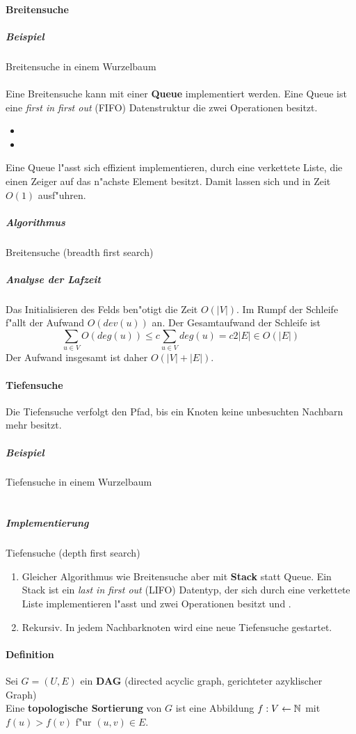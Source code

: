 \paragraph{Breitensuche}
\subparagraph{Beispiel} Breitensuche in einem Wurzelbaum\\
\\ %
Eine Breitensuche kann mit einer \textbf{Queue} implementiert werden. Eine Queue ist eine
\textit{first in first out} (FIFO) Datenstruktur die zwei Operationen besitzt.
\begin{itemize}
    \item {}
    \item {}
\end{itemize}
Eine Queue l"asst sich effizient implementieren, durch eine verkettete Liste, die einen Zeiger auf das n"achste
Element besitzt. Damit lassen sich  und  in Zeit $O(1)$ ausf"uhren.

\subparagraph{Algorithmus} Breitensuche (breadth first search)

\subparagraph{Analyse der Lafzeit} \parskp
Das Initialisieren des Felds  ben"otigt die Zeit $O(|V|)$. Im Rumpf der  Schleife
f"allt der Aufwand $O(dev(u))$ an. Der Gesamtaufwand der  Schleife ist
\[
    \sum_{u\in V}O(deg(u))\le c\sum_{u\in V}deg(u)=c2|E|\in O(|E|)    
\]
Der Aufwand insgesamt ist daher $O(|V|+|E|)$.

\paragraph{Tiefensuche}
Die Tiefensuche verfolgt den Pfad, bis ein Knoten keine unbesuchten Nachbarn mehr besitzt.

\subparagraph{Beispiel} Tiefensuche in einem Wurzelbaum\\
\\  %

\subparagraph{Implementierung} Tiefensuche (depth first search)
\begin{enumerate}
    \item Gleicher Algorithmus wie Breitensuche aber mit \textbf{Stack} statt Queue. Ein Stack ist ein
          \textit{last in first out} (LIFO) Datentyp, der sich durch eine verkettete Liste implementieren
          l"asst und zwei Operationen besitzt  und .
    \item Rekursiv. In jedem Nachbarknoten wird eine neue Tiefensuche gestartet.
\end{enumerate}

\paragraph{Definition} Sei $G=(U,E)$ ein \textbf{DAG} (directed acyclic graph, gerichteter azyklischer Graph)\\
Eine \textbf{topologische Sortierung} von $G$ ist eine Abbildung $f:V\leftarrow\mathbb{N}$ mit $f(u)>f(v)$ f"ur $(u,v)\in E$.
